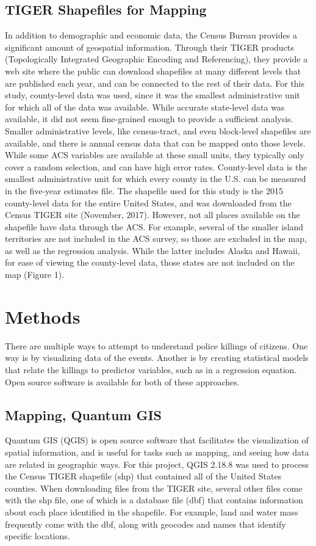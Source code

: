 \documentclass[sigconf]{acmart}
\begin{document}
\subsection{TIGER Shapefiles for Mapping}
In addition to demographic and economic data, the Census Bureau provides a significant amount of geospatial information.  Through their TIGER products (Topologically Integrated Geographic Encoding and Referencing), they provide a web site where the public can download shapefiles at many different levels that are published each year, and can be connected to the rest of their data. \cite{tiger} For this study, county-level data was used, since it was the smallest administrative unit for which all of the data was available.  While accurate state-level data was available, it did not seem fine-grained enough to provide a sufficient analysis.  Smaller administrative levels, like census-tract, and even block-level shapefiles are available, and there is annual census data that can be mapped onto those levels.  While some ACS variables are available at these small units, they typically only cover a random selection, and can have high error rates.  County-level data is the smallest administrative unit for which every county in the U.S. can be measured in the five-year estimates file.  The shapefile used for this study is the 2015 county-level data for the entire United States, and was downloaded from the Census TIGER site (November, 2017). \cite{tiger}  However, not all places available on the shapefile have data through the ACS.  For example, several of the smaller island territories are not included in the ACS survey, so those are excluded in the map, as well as the regression analysis.  While the latter includes Alaska and Hawaii, for ease of viewing the county-level data, those states are not included on the map (Figure 1).

\section{Methods}

There are multiple ways to attempt to understand police killings of citizens.  One way is by visualizing data of the events.  Another is by creating statistical models that relate the killings to predictor variables, such as in a regression equation.  Open source software is available for both of these approaches.

\subsection{Mapping, Quantum GIS}
Quantum GIS (QGIS) is open source software that facilitates the visualization of spatial information, and is useful for tasks such as mapping, and seeing how data are related in geographic ways. \cite{qgis} For this project, QGIS 2.18.8 was used to process the Census TIGER shapefile (shp) that contained all of the United States counties.  When downloading files from the TIGER site, several other files come with the shp file, one of which is a database file (dbf) that contains information about each place identified in the shapefile.  For example, land and water mass frequently come with the dbf, along with geocodes and names that identify specific locations. 
\end{document}
